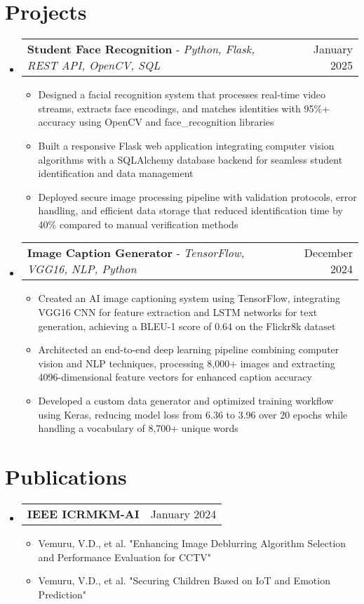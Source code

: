 \documentclass[letterpaper,10.5pt]{article}
\makeatletter
\newcommand{\resumeItem}[1]{
  \item\small{
    {#1 \vspace{-3pt}}
  }
}
\newcommand{\resumeProjectHeading}[2]{
    \item
    \begin{tabular*}{0.97\textwidth}{l@{\extracolsep{\fill}}r}
      \small#1 & #2 \\
    \end{tabular*}\vspace{-5pt}
}
\newcommand{\resumePublicationsHeading}[2]{
    \item
    \begin{tabular*}{0.97\textwidth}{l@{\extracolsep{\fill}}r}
      \small#1 & #2 \\
    \end{tabular*}\vspace{-6pt}
}
\newcommand{\resumeSubHeadingListStart}{\begin{itemize}[leftmargin=*]}
\newcommand{\resumeSubHeadingListEnd}{\end{itemize}}
\newcommand{\resumeItemListStart}{\begin{itemize}}
\newcommand{\resumeItemListEnd}{\end{itemize}\vspace{-6pt}}
\makeatother
\begin{document}
\section{Projects}
    \resumeSubHeadingListStart
      \resumeProjectHeading
          {\textbf{Student Face Recognition} - \emph{Python, Flask, REST API, OpenCV, SQL}}{January 2025}
          \resumeItemListStart
            \resumeItem{Designed a facial recognition system that processes real-time video streams, extracts face encodings, and matches identities with 95\%+ accuracy using OpenCV and face\_recognition libraries}
            \resumeItem{Built a responsive Flask web application integrating computer vision algorithms with a SQLAlchemy database backend for seamless student identification and data management}
            \resumeItem{Deployed secure image processing pipeline with validation protocols, error handling, and efficient data storage that reduced identification time by 40\% compared to manual verification methods}
          \resumeItemListEnd
      \resumeProjectHeading
          {\textbf{Image Caption Generator} - \emph{TensorFlow, VGG16, NLP, Python}}{December 2024}
          \resumeItemListStart
            \resumeItem{Created an AI image captioning system using TensorFlow, integrating VGG16 CNN for feature extraction and LSTM networks for text generation, achieving a BLEU-1 score of 0.64 on the Flickr8k dataset}
            \resumeItem{Architected an end-to-end deep learning pipeline combining computer vision and NLP techniques, processing 8,000+ images and extracting 4096-dimensional feature vectors for enhanced caption accuracy}
            \resumeItem{Developed a custom data generator and optimized training workflow using Keras, reducing model loss from 6.36 to 3.96 over 20 epochs while handling a vocabulary of 8,700+ unique words}
          \resumeItemListEnd
    \resumeSubHeadingListEnd

\section{Publications}
    \resumeSubHeadingListStart
      \resumePublicationsHeading
          {\textbf{IEEE ICRMKM-AI}}{January 2024}
          \resumeItemListStart
            \resumeItem{Vemuru, V.D., et al. "Enhancing Image Deblurring Algorithm Selection and Performance Evaluation for CCTV"}
            \resumeItem{Vemuru, V.D., et al. "Securing Children Based on IoT and Emotion Prediction"}
          \resumeItemListEnd
    \resumeSubHeadingListEnd
\end{document}
